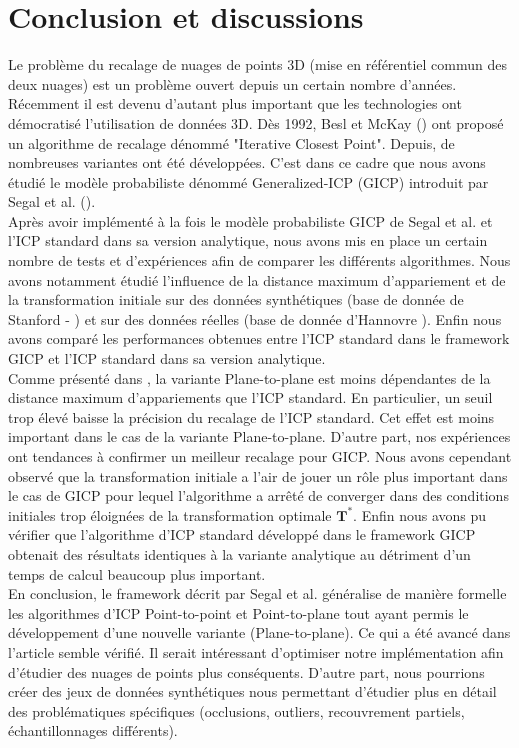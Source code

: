 \section{Conclusion et discussions}

Le problème du recalage de nuages de points 3D (mise en référentiel commun des deux nuages) est un problème ouvert depuis un certain nombre d'années. Récemment il est devenu d'autant plus important que les technologies ont démocratisé l'utilisation de données 3D. Dès 1992, Besl et McKay (\cite{bib_icp}) ont proposé un algorithme de recalage dénommé "Iterative Closest Point". Depuis, de nombreuses variantes ont été développées. C'est dans ce cadre que nous avons étudié le modèle probabiliste dénommé Generalized-ICP (GICP) introduit par Segal et al. (\cite{bib_gicp}).\\

Après avoir implémenté à la fois le modèle probabiliste GICP de Segal et al. et l'ICP standard dans sa version analytique, nous avons mis en place un certain nombre de tests et d'expériences afin de comparer les différents algorithmes. Nous avons notamment étudié l'influence de la distance maximum d'appariement et de la transformation initiale sur des données synthétiques (base de donnée de Stanford - \cite{Stanford}) et sur des données réelles (base de donnée d'Hannovre \cite{Hannovr}). Enfin nous avons comparé les performances obtenues entre l'ICP standard dans le framework GICP et l'ICP standard dans sa version analytique.\\

Comme présenté dans \cite{bib_gicp}, la variante Plane-to-plane est moins dépendantes de la distance maximum d'appariements que l'ICP standard. En particulier, un seuil trop élevé baisse la précision du recalage de l'ICP standard. Cet effet est moins important dans le cas de la variante Plane-to-plane. D'autre part, nos expériences ont tendances à confirmer un meilleur recalage pour GICP. Nous avons cependant observé que la transformation initiale a l'air de jouer un rôle plus important dans le cas de GICP pour lequel l'algorithme a arrêté de converger dans des conditions initiales trop éloignées de la transformation optimale $\mathbf{T^{*}}$. Enfin nous avons pu vérifier que l'algorithme d'ICP standard développé dans le framework GICP obtenait des résultats identiques à la variante analytique au détriment d'un temps de calcul beaucoup plus important. \\

En conclusion, le framework décrit par Segal et al. généralise de manière formelle les algorithmes d'ICP Point-to-point et Point-to-plane tout ayant permis le développement d'une nouvelle variante (Plane-to-plane). Ce qui a été avancé dans l'article semble vérifié. Il serait intéressant d'optimiser notre implémentation afin d'étudier des nuages de points plus conséquents. D'autre part, nous pourrions créer des jeux de données synthétiques nous permettant d'étudier plus en détail des problématiques spécifiques (occlusions, outliers, recouvrement partiels, échantillonnages différents).
